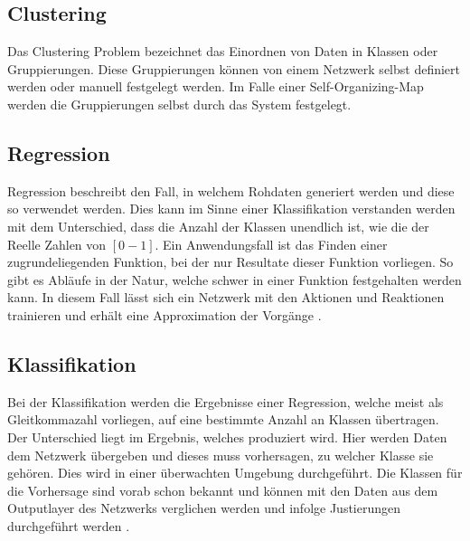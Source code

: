 \subsection{Clustering}
\label{subsec:Clustering}

Das Clustering Problem bezeichnet das Einordnen von Daten in Klassen oder Gruppierungen. 
Diese Gruppierungen können von einem Netzwerk selbst definiert werden oder manuell festgelegt werden. 
Im Falle einer Self-Organizing-Map werden die Gruppierungen selbst durch das System festgelegt.

\subsection{Regression}
\label{subsec:Regression}

Regression beschreibt den Fall, in welchem Rohdaten generiert werden und diese so verwendet werden. 
Dies kann im Sinne einer Klassifikation verstanden werden mit dem Unterschied, dass die Anzahl der Klassen unendlich ist, wie die der Reelle Zahlen von $[0 - 1]$. 
Ein Anwendungsfall ist das Finden einer zugrundeliegenden Funktion, bei der nur Resultate dieser Funktion vorliegen. 
So gibt es Abläufe in der Natur, welche schwer in einer Funktion festgehalten werden kann. 
In diesem Fall lässt sich ein Netzwerk mit den Aktionen und Reaktionen trainieren und erhält eine Approximation der Vorgänge \cite{bishop2006pattern}.

\subsection{Klassifikation}
\label{subsec:Classification}

Bei der Klassifikation werden die Ergebnisse einer Regression, welche meist als Gleitkommazahl vorliegen, auf eine bestimmte Anzahl an Klassen übertragen. 
Der Unterschied liegt im Ergebnis, welches produziert wird.  
Hier werden Daten dem Netzwerk übergeben und dieses muss vorhersagen, zu welcher Klasse sie gehören. Dies wird in einer überwachten Umgebung durchgeführt. 
Die Klassen für die Vorhersage sind vorab schon bekannt und können mit den Daten aus dem Outputlayer des Netzwerks verglichen werden und infolge Justierungen durchgeführt werden \cite{AI3}. \\

